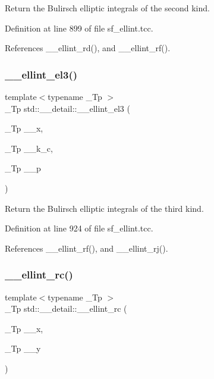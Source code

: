 Return the Bulirsch elliptic integrals of the second kind. 

Definition at line 899 of file sf\+\_\+ellint.\+tcc.



References \+\_\+\+\_\+ellint\+\_\+rd(), and \+\_\+\+\_\+ellint\+\_\+rf().

\mbox{\label{namespacestd_1_1____detail_a2a2b5b80edd39b3d1f852f10c5f277fc}} 
\subsubsection{\texorpdfstring{\+\_\+\+\_\+ellint\+\_\+el3()}{\_\_ellint\_el3()}}
{\footnotesize\ttfamily template$<$typename \+\_\+\+Tp $>$ \\
\+\_\+\+Tp std\+::\+\_\+\+\_\+detail\+::\+\_\+\+\_\+ellint\+\_\+el3 (\begin{DoxyParamCaption}\item[{\+\_\+\+Tp}]{\+\_\+\+\_\+x,  }\item[{\+\_\+\+Tp}]{\+\_\+\+\_\+k\+\_\+c,  }\item[{\+\_\+\+Tp}]{\+\_\+\+\_\+p }\end{DoxyParamCaption})}

Return the Bulirsch elliptic integrals of the third kind. 

Definition at line 924 of file sf\+\_\+ellint.\+tcc.



References \+\_\+\+\_\+ellint\+\_\+rf(), and \+\_\+\+\_\+ellint\+\_\+rj().

\mbox{\label{namespacestd_1_1____detail_aa7d81e41240a6d031414c6b117889e36}} 
\subsubsection{\texorpdfstring{\+\_\+\+\_\+ellint\+\_\+rc()}{\_\_ellint\_rc()}}
{\footnotesize\ttfamily template$<$typename \+\_\+\+Tp $>$ \\
\+\_\+\+Tp std\+::\+\_\+\+\_\+detail\+::\+\_\+\+\_\+ellint\+\_\+rc (\begin{DoxyParamCaption}\item[{\+\_\+\+Tp}]{\+\_\+\+\_\+x,  }\item[{\+\_\+\+Tp}]{\+\_\+\+\_\+y }\end{DoxyParamCaption})}



